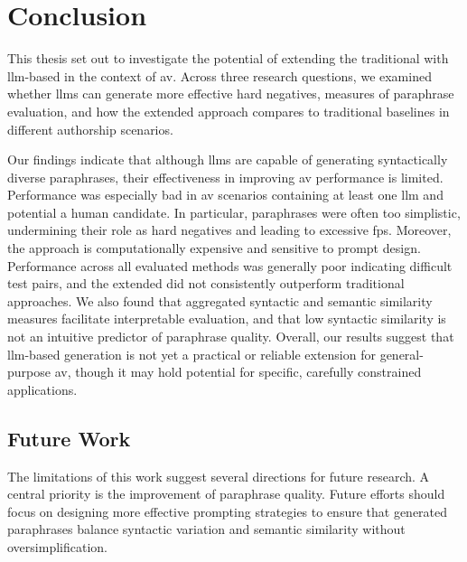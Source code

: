 \chapter{Conclusion}
\label{chap:conclusion}

This thesis set out to investigate the potential of extending the traditional \impAppr{} with \ac{llm}-based \imps{} in the context of \ac{av}. 
Across three research questions, we examined whether \acp{llm} can generate more effective hard negatives, measures of paraphrase evaluation, and how the extended approach compares to traditional baselines in different authorship scenarios. 

Our findings indicate that although \acp{llm} are capable of generating syntactically diverse paraphrases, their effectiveness in improving \ac{av} performance is limited. 
Performance was especially bad in \ac{av} scenarios containing at least one \ac{llm} and potential a human candidate.
In particular, paraphrases were often too simplistic, undermining their role as hard negatives and leading to excessive \acp{fp}. 
Moreover, the approach is computationally expensive and sensitive to prompt design. 
Performance across all evaluated methods was generally poor indicating difficult test pairs, and the extended \impAppr{} did not consistently outperform traditional approaches. 
We also found that aggregated syntactic and semantic similarity measures facilitate interpretable evaluation, and that low syntactic similarity is not an intuitive predictor of paraphrase quality. 
Overall, our results suggest that \ac{llm}-based \imp{} generation is not yet a practical or reliable extension for general-purpose \ac{av}, though it may hold potential for specific, carefully constrained applications.


\section{Future Work}

The limitations of this work suggest several directions for future research. 
A central priority is the improvement of paraphrase quality. 
Future efforts should focus on designing more effective prompting strategies to ensure that generated paraphrases balance syntactic variation and semantic similarity without oversimplification. 


